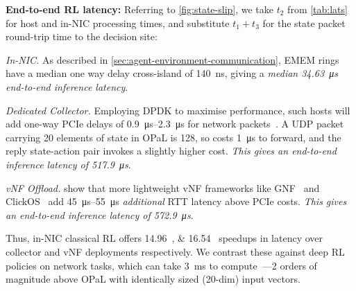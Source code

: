 \documentclass[
conference
,10pt
]{IEEEtran}
\newcommand{\fakepara}[1]{\noindent\textbf{#1:}}
\newcommand{\approachshort}{OPaL}
\begin{document}
\fakepara{End-to-end RL latency}
Referring to \cref{fig:state-slip}, we take $t_2$ from \cref{tab:lats} for host and in-NIC processing times, and substitute $t_1+t_3$ for the state packet round-trip time to the decision site:
\begin{LaTeXdescription}
	\item[\emph{In-NIC.}] As described in \cref{sec:agent-environment-communication}, EMEM rings have a median one way delay cross-island of \SI{140}{\nano\second}, giving a \emph{median \SI{34.63}{\micro\second} end-to-end inference latency}.
	\item[\emph{Dedicated Collector.}] Employing DPDK to maximise performance, such hosts will add one-way PCIe delays of \SIrange{0.9}{2.3}{\micro\second} for network packets~\parencite{DBLP:conf/sigcomm/NeugebauerAZAL018}.
	A UDP packet carrying \num{20} elements of state in \approachshort{} is \SI{128}{\byte}, so costs \SI{1}{\micro\second} to forward, and the reply state-action pair invokes a slightly higher cost.
	\emph{This gives an end-to-end inference latency of \SI{517.9}{\micro\second}}.
	\item[\emph{vNF Offload.}] \Textcite{DBLP:journals/cm/CzivaP17} show that more lightweight vNF frameworks like GNF~\parencite{DBLP:journals/cm/CzivaP17} and ClickOS~\parencite{DBLP:conf/nsdi/MartinsAROHBH14} add \SIrange{45}{55}{\micro\second} \emph{additional} RTT latency above PCIe costs.
	\emph{This gives an end-to-end inference latency of \SI{572.9}{\micro\second}}.
\end{LaTeXdescription}
Thus, in-NIC classical RL offers \SIlist{14.96;16.54}{\texttimes} speedups in latency over collector and vNF deployments respectively.
We contrast these against deep RL policies on network tasks, which can take \SI{3}{\milli\second} to compute~\parencite{DBLP:journals/corr/abs-1910-04054}---2 orders of magnitude above \approachshort{} with identically sized (20-dim) input vectors.
\end{document}
